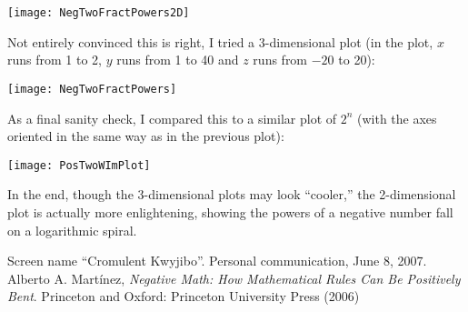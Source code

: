 \documentclass[12pt]{article}
\begin{document}
\begin{center}
\texttt{[image: NegTwoFractPowers2D]}
\end{center}

Not entirely convinced this is right, I tried a 3-dimensional plot (in the plot, $x$ runs from 1 to 2, $y$ runs from 1 to 40 and $z$ runs from $-20$ to 20):

\begin{center}
\texttt{[image: NegTwoFractPowers]}
\end{center}

As a final sanity check, I compared this to a similar plot of $2^n$ (with the axes oriented in the same way as in the previous plot):

\begin{center}
\texttt{[image: PosTwoWImPlot]}
\end{center}

In the end, though the 3-dimensional plots may look ``cooler,'' the 2-dimensional plot is actually more enlightening, showing the powers of a negative number fall on a logarithmic spiral.

\begin{thebibliography}{2}
 Screen name ``Cromulent Kwyjibo''. Personal communication, June 8, 2007.
 Alberto A. Mart\'inez, {\it Negative Math: How Mathematical Rules Can Be Positively Bent}. Princeton and Oxford: Princeton University Press (2006)
\end{thebibliography}
\end{document}
